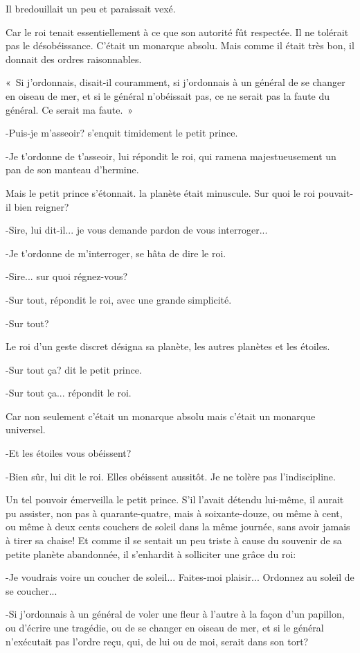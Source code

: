 \documentclass{report}
\begin{document}
Il bredouillait un peu et paraissait vexé.

Car le roi tenait essentiellement à ce que son autorité fût respectée. Il ne tolérait pas le désobéissance. C'était un monarque absolu. Mais comme il était très bon, il donnait des ordres raisonnables.

«~Si j'ordonnais, disait-il couramment, si j'ordonnais à un général de se changer en oiseau de mer, et si le général n'obéissait pas, ce ne serait pas la faute du général. Ce serait ma faute.~»

-Puis-je m'asseoir? s'enquit timidement le petit prince.

-Je t'ordonne de t'asseoir, lui répondit le roi, qui ramena majestueusement un pan de son manteau d'hermine.

Mais le petit prince s'étonnait. la planète était minuscule. Sur quoi le roi pouvait-il bien reigner?

-Sire, lui dit-il... je vous demande pardon de vous interroger...

-Je t'ordonne de m'interroger, se hâta de dire le roi.

-Sire... sur quoi régnez-vous?

-Sur tout, répondit le roi, avec une grande simplicité.

-Sur tout?

Le roi d'un geste discret désigna sa planète, les autres planètes et les étoiles.

-Sur tout ça? dit le petit prince.

-Sur tout ça... répondit le roi.

Car non seulement c'était un monarque absolu mais c'était un monarque universel.

-Et les étoiles vous obéissent?

-Bien sûr, lui dit le roi. Elles obéissent aussitôt. Je ne tolère pas l'indiscipline.

Un tel pouvoir émerveilla le petit prince. S'il l'avait détendu lui-même, il aurait pu assister, non pas à quarante-quatre, mais à soixante-douze, ou même à cent, ou même à deux cents couchers de soleil dans la même journée, sans avoir jamais à tirer sa chaise! Et comme il se sentait un peu triste à cause du souvenir de sa petite planète abandonnée, il s'enhardit à solliciter une grâce du roi:

-Je voudrais voire un coucher de soleil... Faites-moi plaisir... Ordonnez au soleil de se coucher...

-Si j'ordonnais à un général de voler une fleur à l'autre à la façon d'un papillon, ou d'écrire une tragédie, ou de se changer en oiseau de mer, et si le général n'exécutait pas l'ordre reçu, qui, de lui ou de moi, serait dans son tort?
\end{document}
